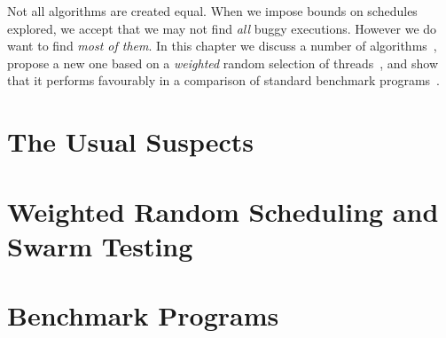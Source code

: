 \chapstart Not all algorithms are created equal.  When we impose bounds on
schedules explored, we accept that we may not find \emph{all} buggy executions.
However we do want to find \emph{most of them}.  In this chapter we discuss a
number of algorithms~, propose a new one based on a
\emph{weighted} random selection of threads~, and show
that it performs favourably in a comparison of standard benchmark
programs~.

\section{The Usual Suspects}
\label{sec:algorithms-usual}

\blindtext

\section{Weighted Random Scheduling and Swarm Testing}
\label{sec:algorithms-swarm}

\blindtext

\section{Benchmark Programs}
\label{sec:algorithms-sctbench}

\blindtext
